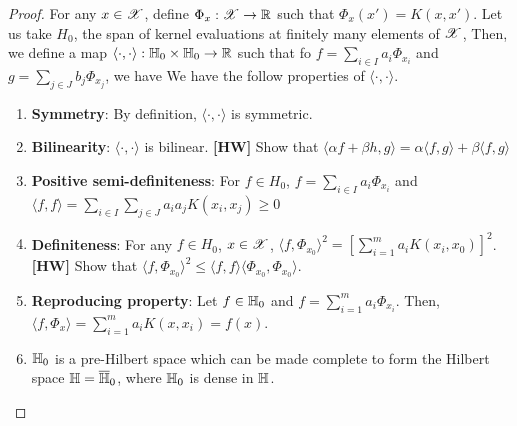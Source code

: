 \documentclass[a4paper,english,12pt]{article}
\begin{document}
\begin{proof}
For any $x \in \mathscr{X}$, define $\Phi_x:\mathscr{X}\to\mathbb{R}$ such that $\Phi_x(x') = K(x,x')$.
Let us take $H_0$, the span of kernel evaluations at finitely many elements of $\mathscr{X}$, 
Then, we define a map $\langle \cdot, \cdot \rangle: \mathbb{H}_0 \times \mathbb{H}_0 \to \mathbb{R}$ such that fo $f = \sum_{i \in I} a_i \Phi_{x_i}$ and $g = \sum_{j \in J} b_j \Phi_{x_j}$, we have 
We have the follow properties of $\langle \cdot, \cdot \rangle$. 
\begin{enumerate}
\item \textbf{Symmetry}: By definition, $\langle \cdot, \cdot \rangle$ is symmetric.
\item \textbf{Bilinearity}: $\langle \cdot, \cdot \rangle$ is bilinear. \textbf{[HW]} Show that $\langle \alpha f + \beta h, g \rangle = \alpha \langle f, g \rangle + \beta \langle f, g \rangle$
\item \textbf{Positive semi-definiteness}: For $f \in H_0$, $f = \sum_{i \in I} a_i \Phi_{x_i}$ and $\langle f, f \rangle = \sum_{i \in I} \sum_{j \in J} a_i a_j K(x_i,x_j) \ge 0$
\item \textbf{Definiteness}: For any $f \in H_0$, $x \in \mathscr{X}$, $\langle f, \Phi_{x_0} \rangle^2 = \left[\sum_{i=1}^m a_i K(x_i, x_0)\right]^2$. \textbf{[HW]} Show that $\langle f, \Phi_{x_0} \rangle^2 \le \langle f, f \rangle \langle \Phi_{x_0}, \Phi_{x_0} \rangle$.
\item \textbf{Reproducing property}: Let $f \in \mathbb{H}_0$ and $f = \sum_{i=1}^m a_i \Phi_{x_i}$. Then, $\langle f, \Phi_x \rangle = \sum_{i=1}^m a_i K(x, x_i) = f(x)$.
\item $\mathbb{H}_0$ is a pre-Hilbert space which can be made complete to form the Hilbert space $\mathbb{H} = \overline{\mathbb{H}}_0$, where $\mathbb{H}_0$ is dense in $\mathbb{H}$. 
\end{enumerate}
\end{proof}
\end{document}
